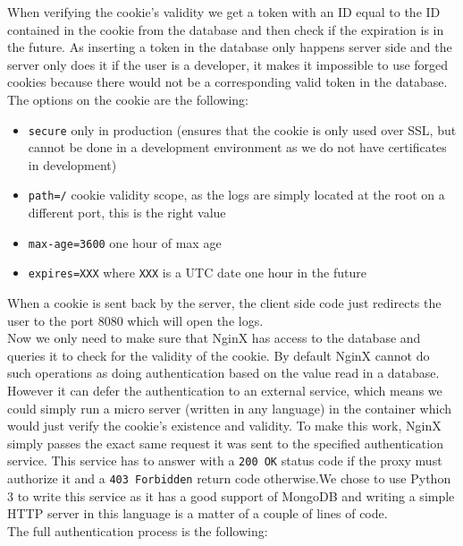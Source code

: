 When verifying the cookie's validity we get a token with an ID equal to the ID contained in the cookie from the database and then check if the expiration is in the future. As inserting a token in the database only happens server side and the server only does it if the user is a developer, it makes it impossible to use forged cookies because there would not be a corresponding valid token in the database. The options on the cookie are the following:
\begin{itemize}
	\item \texttt{secure} only in production (ensures that the cookie is only used over SSL, but cannot be done in a development environment as we do not have certificates in development)
	\item \texttt{path=/} cookie validity scope, as the logs are simply located at the root on a different port, this is the right value
	\item \texttt{max-age=3600} one hour of max age
	\item \texttt{expires=XXX} where \texttt{XXX} is a UTC date one hour in the future
\end{itemize}
When a cookie is sent back by the server, the client side code just redirects the user to the port 8080 which will open the logs.\\
Now we only need to make sure that NginX has access to the database and queries it to check for the validity of the cookie. By default NginX cannot do such operations as doing authentication based on the value read in a database. However it can defer the authentication to an external service, which means we could simply run a micro server (written in any language) in the container which would just verify the cookie's existence and validity. To make this work, NginX simply passes the exact same request it was sent to the specified authentication service. This service has to answer with a \texttt{200 OK} status code if the proxy must authorize it and a \texttt{403 Forbidden} return code otherwise.We chose to use Python 3 to write this service as it has a good support of MongoDB and writing a simple HTTP server in this language is a matter of a couple of lines of code.\\
The full authentication process is the following:

